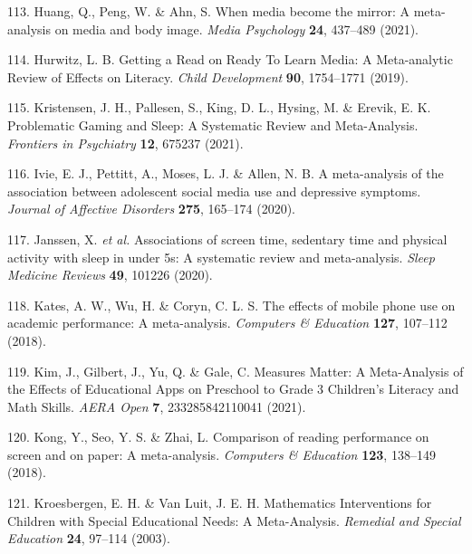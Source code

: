\documentclass[
  english,
  man]{apa6}
\newenvironment{cslreferences}%
  {}%
  {\par}
\begin{document}
\begin{cslreferences}
\leavevmode\hypertarget{ref-huangWhenMediaBecome2021}{}%
113. Huang, Q., Peng, W. \& Ahn, S. When media become the mirror: A meta-analysis on media and body image. \emph{Media Psychology} \textbf{24}, 437--489 (2021).

\leavevmode\hypertarget{ref-hurwitzGettingReadReady2019}{}%
114. Hurwitz, L. B. Getting a Read on Ready To Learn Media: A Meta-analytic Review of Effects on Literacy. \emph{Child Development} \textbf{90}, 1754--1771 (2019).

\leavevmode\hypertarget{ref-kristensenProblematicGamingSleep2021}{}%
115. Kristensen, J. H., Pallesen, S., King, D. L., Hysing, M. \& Erevik, E. K. Problematic Gaming and Sleep: A Systematic Review and Meta-Analysis. \emph{Frontiers in Psychiatry} \textbf{12}, 675237 (2021).

\leavevmode\hypertarget{ref-ivieMetaanalysisAssociationAdolescent2020}{}%
116. Ivie, E. J., Pettitt, A., Moses, L. J. \& Allen, N. B. A meta-analysis of the association between adolescent social media use and depressive symptoms. \emph{Journal of Affective Disorders} \textbf{275}, 165--174 (2020).

\leavevmode\hypertarget{ref-janssenAssociationsScreenTime2020}{}%
117. Janssen, X. \emph{et al.} Associations of screen time, sedentary time and physical activity with sleep in under 5s: A systematic review and meta-analysis. \emph{Sleep Medicine Reviews} \textbf{49}, 101226 (2020).

\leavevmode\hypertarget{ref-katesEffectsMobilePhone2018}{}%
118. Kates, A. W., Wu, H. \& Coryn, C. L. S. The effects of mobile phone use on academic performance: A meta-analysis. \emph{Computers \& Education} \textbf{127}, 107--112 (2018).

\leavevmode\hypertarget{ref-kimMeasuresMatterMetaAnalysis2021}{}%
119. Kim, J., Gilbert, J., Yu, Q. \& Gale, C. Measures Matter: A Meta-Analysis of the Effects of Educational Apps on Preschool to Grade 3 Children's Literacy and Math Skills. \emph{AERA Open} \textbf{7}, 233285842110041 (2021).

\leavevmode\hypertarget{ref-kongComparisonReadingPerformance2018}{}%
120. Kong, Y., Seo, Y. S. \& Zhai, L. Comparison of reading performance on screen and on paper: A meta-analysis. \emph{Computers \& Education} \textbf{123}, 138--149 (2018).

\leavevmode\hypertarget{ref-kroesbergenMathematicsInterventionsChildren2003}{}%
121. Kroesbergen, E. H. \& Van Luit, J. E. H. Mathematics Interventions for Children with Special Educational Needs: A Meta-Analysis. \emph{Remedial and Special Education} \textbf{24}, 97--114 (2003).


\end{cslreferences}
\end{document}
